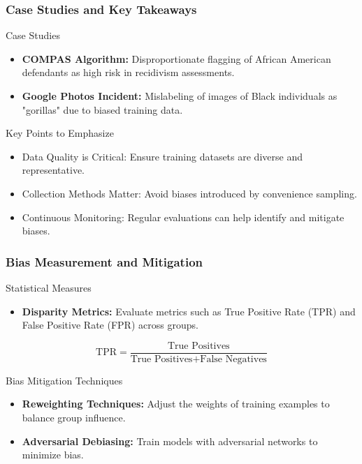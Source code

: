 \documentclass[aspectratio=169]{beamer}
\begin{document}
\begin{frame}[fragile]
    \frametitle{Case Studies and Key Takeaways}
    \begin{block}{Case Studies}
        \begin{itemize}
            \item \textbf{COMPAS Algorithm:} Disproportionate flagging of African American defendants as high risk in recidivism assessments.
            \item \textbf{Google Photos Incident:} Mislabeling of images of Black individuals as "gorillas" due to biased training data.
        \end{itemize}
    \end{block}
    
    \begin{block}{Key Points to Emphasize}
        \begin{itemize}
            \item Data Quality is Critical: Ensure training datasets are diverse and representative.
            \item Collection Methods Matter: Avoid biases introduced by convenience sampling.
            \item Continuous Monitoring: Regular evaluations can help identify and mitigate biases.
        \end{itemize}
    \end{block}
\end{frame}

\begin{frame}[fragile]
    \frametitle{Bias Measurement and Mitigation}
    \begin{block}{Statistical Measures}
        \begin{itemize}
            \item \textbf{Disparity Metrics:} Evaluate metrics such as True Positive Rate (TPR) and False Positive Rate (FPR) across groups.
        \end{itemize}
        \begin{equation}
            \text{TPR} = \frac{\text{True Positives}}{\text{True Positives} + \text{False Negatives}}
        \end{equation}
    \end{block}
    
    \begin{block}{Bias Mitigation Techniques}
        \begin{itemize}
            \item \textbf{Reweighting Techniques:} Adjust the weights of training examples to balance group influence.
            \item \textbf{Adversarial Debiasing:} Train models with adversarial networks to minimize bias.
        \end{itemize}
    \end{block}
\end{frame}
\end{document}
